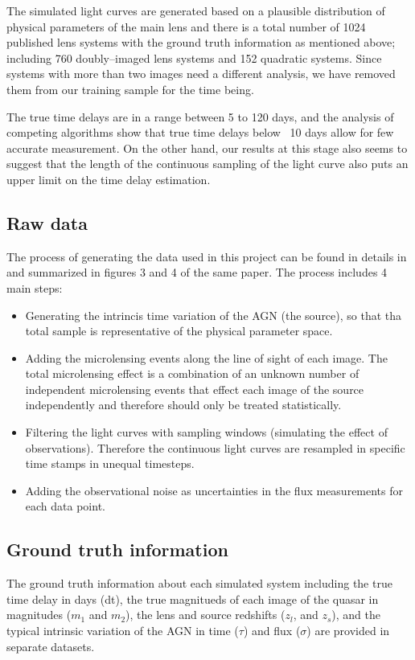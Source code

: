 \documentclass[a4paper, 11pt]{article}
\begin{document}
The simulated light curves are generated based on a plausible distribution of physical parameters of the main lens and there is a total number of 1024 published lens systems with the ground truth information as mentioned above; including 760 doubly--imaged lens systems and 152 quadratic systems. Since systems with more than two images need a different analysis, we have removed them from our training sample for the time being.

The true time delays are in a range between 5 to 120 days, and the analysis of competing algorithms show that true time delays below ~10 days allow for few accurate measurement. On the other hand, our results at this stage also seems to suggest that the length of the continuous sampling of the light curve also puts an upper limit on the time delay estimation.

\subsection{Raw data}
The process of generating the data used in this project can be found in details in \citet{Liao+2014} and summarized in figures 3 and 4 of the same paper. The process includes 4 main steps:
\begin{itemize}
  \item Generating the intrincis time variation of the AGN (the source), so that tha total sample is representative of the physical parameter space.
  \item Adding the microlensing events along the line of sight of each image. The total microlensing effect is a combination of an unknown number of independent microlensing events that effect each image of the source independently and therefore should only be treated statistically.
  \item Filtering the light curves with sampling windows (simulating the effect of observations). Therefore the continuous light curves are resampled in specific time stamps in unequal timesteps.
  \item Adding the observational noise as uncertainties in the flux measurements for each data point.
\end{itemize}

\subsection{Ground truth information}
The ground truth information about each simulated system including the true time delay in days (dt), the true magnitueds of each image of the quasar in magnitudes ($m_1$ and $m_2$), the lens and source redshifts ($z_l$, and $z_s$), and the typical intrinsic variation of the AGN in time ($\tau$) and flux ($\sigma$) are provided in separate datasets.
\end{document}
